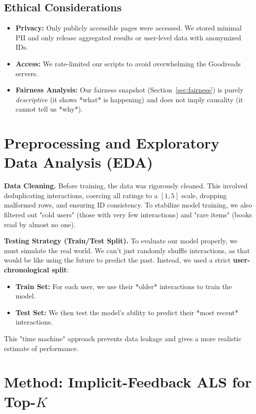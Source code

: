 \documentclass[11pt,a4paper]{article}
\begin{document}
\subsection*{Ethical Considerations}
\begin{itemize}
    \item \textbf{Privacy:} Only publicly accessible pages were accessed. We stored minimal PII and only release aggregated results or user-level data with anonymized IDs.
    \item \textbf{Access:} We rate-limited our scripts to avoid overwhelming the Goodreads servers.
    \item \textbf{Fairness Analysis:} Our fairness snapshot (Section~\ref{sec:fairness}) is purely \emph{descriptive} (it shows *what* is happening) and does not imply causality (it cannot tell us *why*).
\end{itemize}

\section{Preprocessing and Exploratory Data Analysis (EDA)}
\textbf{Data Cleaning.} Before training, the data was rigorously cleaned. This involved deduplicating interactions, coercing all ratings to a $[1,5]$ scale, dropping malformed rows, and ensuring ID consistency. To stabilize model training, we also filtered out "cold users" (those with very few interactions) and "rare items" (books read by almost no one).

\textbf{Testing Strategy (Train/Test Split).} To evaluate our model properly, we must simulate the real world. We can't just randomly shuffle interactions, as that would be like using the future to predict the past. Instead, we used a strict \textbf{user-chronological split}:
\begin{itemize}
    \item \textbf{Train Set:} For each user, we use their *older* interactions to train the model.
    \item \textbf{Test Set:} We then test the model's ability to predict their *most recent* interactions.
\end{itemize}
This "time machine" approach prevents data leakage and gives a more realistic estimate of performance.

\section{Method: Implicit-Feedback ALS for Top-$K$}
\end{document}
